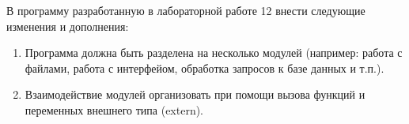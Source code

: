 В программу разработанную в лабораторной работе 12 внести следующие изменения и дополнения:

\begin{enumerate}
    \item Программа должна быть разделена на несколько модулей (например: работа с файлами, работа с интерфейом, обработка запросов к базе данных и т.п.).
    \item Взаимодействие модулей организовать при помощи вызова функций и переменных
    внешнего типа (extern).
\end{enumerate}

